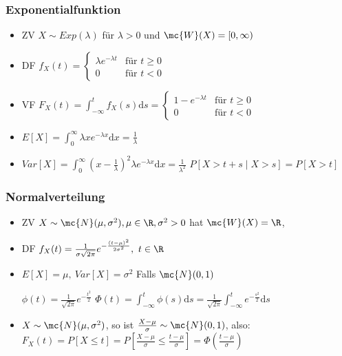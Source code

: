 \subsubsection{Exponentialfunktion}
\begin{itemize}
    \item ZV $X \sim Exp(\lambda)$ für $\lambda > 0$ und $\mc{W}(X) = [0, \infty)$
    \item DF $f_X(t) =
\begin{cases}
    \lambda e ^{-\lambda t} &\text{für } t \ge 0\\
    0 & \text{für } t < 0
\end{cases}$
    \item VF $F_X(t) = \int_{-\infty}^{t} f_X(s) \mathrm{d}s =
\begin{cases}
    1 - e^{- \lambda t} &\text{für } t \ge 0\\
    0 &\text{für } t < 0
\end{cases}$
    \item $E[X] = \int_{0}^{\infty} \lambda x e^{-\lambda x} \mathrm{d}x = \frac{1}{\lambda}$
    \item $Var[X] = \int_{0}^{\infty} (x - \frac{1}{\lambda})^2 \lambda e^{-\lambda x} \mathrm{d}x = \frac{1}{\lambda^2}$
     $P[X > t + s \mid X > s] = P[X > t]$
\end{itemize}

\subsubsection{Normalverteilung}
\begin{itemize}
    \item ZV $X \sim \mc{N}(\mu, \sigma^2), \mu \in \R, \sigma^2 > 0$ hat $\mc{W}(X) = \R$, 
    \item DF $f_X(t) = \frac{1}{\sigma \sqrt{2 \pi}} e^{- \frac{(t - \mu)^2}{2 \sigma^2}}, \ t \in \R$
    \item $E[X] = \mu, \ Var[X] = \sigma^2$
     Falls $\mc{N}(0, 1)$
        \begin{itemize}
             $\phi(t) = \frac{1}{\sqrt{2 \pi}} e^{-\frac{t^2}{2}}$
             $\Phi(t) = \int_{-\infty}^{t} \phi(s) \mathrm{d}s = \frac{1}{\sqrt{2 \pi}} \int_{-\infty}^{t} e ^{-\frac{s^2}{2}}\mathrm{d}s$
        \end{itemize}
    \item $X \sim \mc{N}(\mu, \sigma^2)$, so ist $\frac{X - \mu}{\sigma} \sim \mc{N}(0, 1)$, also: $F_X(t) = P[X \le t] = P[\frac{X - \mu}{\sigma} \le \frac{t - \mu}{\sigma}] = \Phi(\frac{t - \mu}{\sigma})$
\end{itemize}

